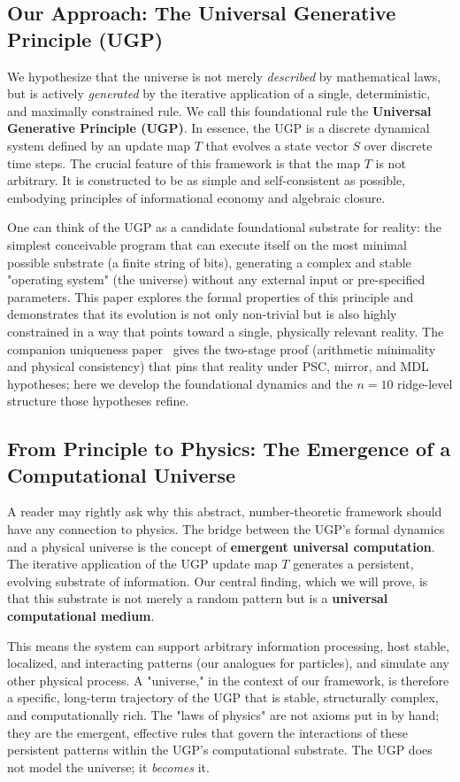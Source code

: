 \documentclass[12pt]{article}
\numberwithin{equation}{section}
\begin{document}
\subsection{Our Approach: The Universal Generative Principle (UGP)}
We hypothesize that the universe is not merely \textit{described} by mathematical laws, but is actively \textit{generated} by the iterative application of a single, deterministic, and maximally constrained rule. We call this foundational rule the \textbf{Universal Generative Principle (UGP)}. In essence, the UGP is a discrete dynamical system defined by an update map $T$ that evolves a state vector $S$ over discrete time steps. The crucial feature of this framework is that the map $T$ is not arbitrary. It is constructed to be as simple and self-consistent as possible, embodying principles of informational economy and algebraic closure.

One can think of the UGP as a candidate foundational substrate for reality: the simplest conceivable program that can execute itself on the most minimal possible substrate (a finite string of bits), generating a complex and stable "operating system" (the universe) without any external input or pre-specified parameters. This paper explores the formal properties of this principle and demonstrates that its evolution is not only non-trivial but is also highly constrained in a way that points toward a single, physically relevant reality. The companion uniqueness paper~\cite{SpivackUGPUniqueness} gives the two-stage proof (arithmetic minimality and physical consistency) that pins that reality under PSC, mirror, and MDL hypotheses; here we develop the foundational dynamics and the $n=10$ ridge-level structure those hypotheses refine.

\subsection{From Principle to Physics: The Emergence of a Computational Universe}
A reader may rightly ask why this abstract, number-theoretic framework should have any connection to physics. The bridge between the UGP's formal dynamics and a physical universe is the concept of \textbf{emergent universal computation}. The iterative application of the UGP update map $T$ generates a persistent, evolving substrate of information. Our central finding, which we will prove, is that this substrate is not merely a random pattern but is a \textbf{universal computational medium}.

This means the system can support arbitrary information processing, host stable, localized, and interacting patterns (our analogues for particles), and simulate any other physical process. A "universe," in the context of our framework, is therefore a specific, long-term trajectory of the UGP that is stable, structurally complex, and computationally rich. The "laws of physics" are not axioms put in by hand; they are the emergent, effective rules that govern the interactions of these persistent patterns within the UGP's computational substrate. The UGP does not model the universe; it \textit{becomes} it.
\end{document}
